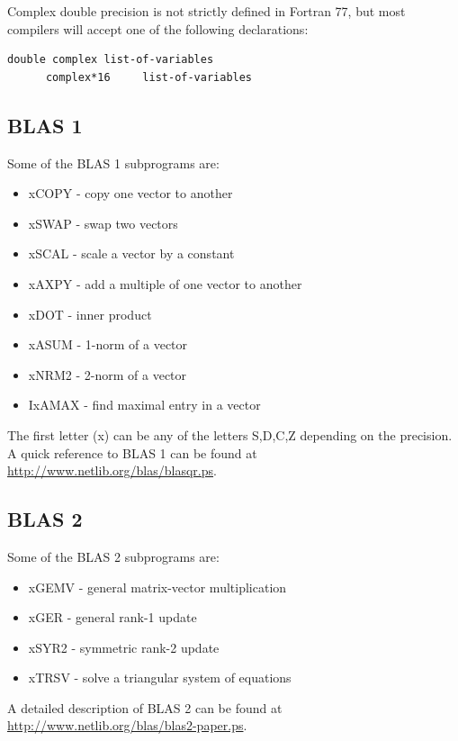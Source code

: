 Complex double precision is not strictly defined in Fortran 77, but most compilers will accept one of the following declarations:

\begin{lstlisting}[style=fortran77]
      double complex list-of-variables
      complex*16     list-of-variables
\end{lstlisting}

\subsection{BLAS 1}

Some of the BLAS 1 subprograms are:

\begin{itemize}
    \item xCOPY - copy one vector to another
    \item xSWAP - swap two vectors
    \item xSCAL - scale a vector by a constant
    \item xAXPY - add a multiple of one vector to another
    \item xDOT - inner product
    \item xASUM - 1-norm of a vector
    \item xNRM2 - 2-norm of a vector
    \item IxAMAX - find maximal entry in a vector
\end{itemize}

The first letter (x) can be any of the letters S,D,C,Z depending on the precision. A quick reference to BLAS 1 can be found at \url{http://www.netlib.org/blas/blasqr.ps}.

\subsection{BLAS 2}

Some of the BLAS 2 subprograms are:

\begin{itemize}
    \item xGEMV - general matrix-vector multiplication
    \item xGER - general rank-1 update
    \item xSYR2 - symmetric rank-2 update
    \item xTRSV - solve a triangular system of equations
\end{itemize}

A detailed description of BLAS 2 can be found at \url{http://www.netlib.org/blas/blas2-paper.ps}.

